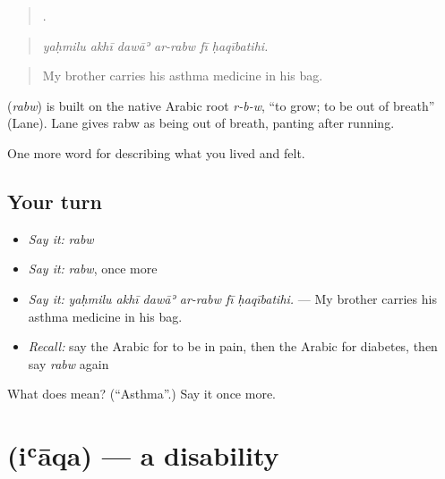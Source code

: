 \begin{quote}
     .
\end{quote}

\begin{quote}
\emph{yaḥmilu akhī dawāʾ ar-rabw fī ḥaqībatihi.}
\end{quote}

\begin{quote}
My brother carries his asthma medicine in his bag.
\end{quote}

\begin{cousinweb}
\textbf{} (\emph{rabw}) is built on the native Arabic root \emph{r-b-w}, \textquotedblleft{}to grow; to be out of breath\textquotedblright{} (Lane). Lane gives rabw as being out of breath, panting after running.
\end{cousinweb}

\begin{grammarlens}[title={What you've built}]
One more word for describing what you lived and felt.
\end{grammarlens}

\subsection*{Your turn}
\begin{itemize}
\raggedright
  \item \emph{Say it:} \emph{rabw}
  \item \emph{Say it:} \emph{rabw}, once more
  \item \emph{Say it:} \emph{yaḥmilu akhī dawāʾ ar-rabw fī ḥaqībatihi.} — My brother carries his asthma medicine in his bag.
  \item \emph{Recall:} say the Arabic for to be in pain, then the Arabic for diabetes, then say \emph{rabw} again
\end{itemize}

\begin{tcolorbox}[breakable,colback=teal!4,colframe=teal!35!black,title={Before you move on}]
What does  mean? (\textquotedblleft{}Asthma\textquotedblright{}.) Say it once more.
\end{tcolorbox}
\section[\texorpdfstring{\ar{إعاقة} (iʿāqa)}{إعاقة (iʿāqa)}]{ (iʿāqa) — a disability}

